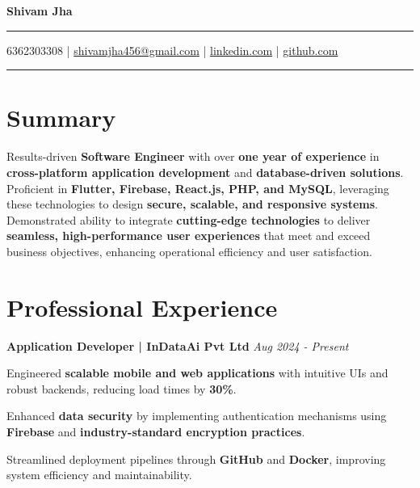 \documentclass[a4paper,11pt]{article}
\begin{document}
\begin{center}
    {\Huge \textbf{Shivam Jha}} \\
    \vspace{0.4em}
    \hrule
    \vspace{0.4em}
    6362303308 \hspace{1em} | \hspace{1em} \href{mailto:shivamjha456@gmail.com}{shivamjha456@gmail.com} \hspace{1em} | \hspace{1em} \href{https://www.linkedin.com/in/shivam-jha-496193231/}{linkedin.com} \hspace{1em} | \hspace{1em} \href{https://github.com/samjha1}{github.com} \\
    \vspace{0.4em}
    \hrule
\end{center}


\vspace{0.5em}

\section*{Summary}
Results-driven \textbf{Software Engineer} with over \textbf{one year of experience} in \textbf{cross-platform application development} and \textbf{database-driven solutions}. Proficient in \textbf{Flutter, Firebase, React.js, PHP, and MySQL}, leveraging these technologies to design \textbf{secure, scalable, and responsive systems}. Demonstrated ability to integrate \textbf{cutting-edge technologies} to deliver \textbf{seamless, high-performance user experiences} that meet and exceed business objectives, enhancing operational efficiency and user satisfaction.

\section*{Professional Experience}

\textbf{Application Developer | InDataAi Pvt Ltd} \hfill \textit{Aug 2024 - Present} \\
\begin{compactitem}
    \item Engineered \textbf{scalable mobile and web applications} with intuitive UIs and robust backends, reducing load times by \textbf{30\%}.
    \item Enhanced \textbf{data security} by implementing authentication mechanisms using \textbf{Firebase} and \textbf{industry-standard encryption practices}.
    \item Streamlined deployment pipelines through \textbf{GitHub} and \textbf{Docker}, improving system efficiency and maintainability.
\end{compactitem}
\end{document}
